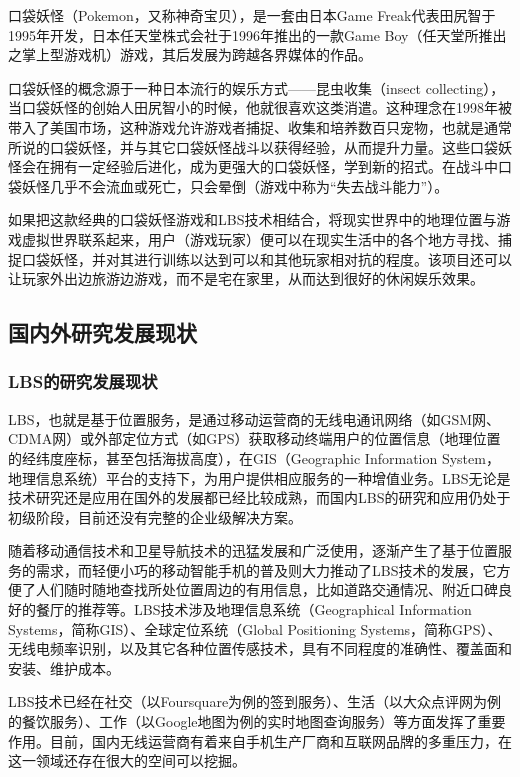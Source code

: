 \documentclass{article}
\begin{document}
\begin{CJK}{UTF8}{gbsn}
	口袋妖怪（Pokemon，又称神奇宝贝），是一套由日本Game Freak代表田尻智于1995年开发，日本任天堂株式会社于1996年推出的一款Game Boy（任天堂所推出之掌上型游戏机）游戏，其后发展为跨越各界媒体的作品。

	口袋妖怪的概念源于一种日本流行的娱乐方式——昆虫收集（insect collecting），当口袋妖怪的创始人田尻智小的时候，他就很喜欢这类消遣。这种理念在1998年被带入了美国市场，这种游戏允许游戏者捕捉、收集和培养数百只宠物，也就是通常所说的口袋妖怪，并与其它口袋妖怪战斗以获得经验，从而提升力量。这些口袋妖怪会在拥有一定经验后进化，成为更强大的口袋妖怪，学到新的招式。在战斗中口袋妖怪几乎不会流血或死亡，只会晕倒（游戏中称为“失去战斗能力”）。

	如果把这款经典的口袋妖怪游戏和LBS技术相结合，将现实世界中的地理位置与游戏虚拟世界联系起来，用户（游戏玩家）便可以在现实生活中的各个地方寻找、捕捉口袋妖怪，并对其进行训练以达到可以和其他玩家相对抗的程度。该项目还可以让玩家外出边旅游边游戏，而不是宅在家里，从而达到很好的休闲娱乐效果。

	\subsection{国内外研究发展现状}
	\subsubsection{LBS的研究发展现状}
  LBS，也就是基于位置服务，是通过移动运营商的无线电通讯网络（如GSM网、CDMA网）或外部定位方式（如GPS）获取移动终端用户的位置信息（地理位置的经纬度座标，甚至包括海拔高度），在GIS（Geographic Information System，地理信息系统）平台的支持下，为用户提供相应服务的一种增值业务。LBS无论是技术研究还是应用在国外的发展都已经比较成熟，而国内LBS的研究和应用仍处于初级阶段，目前还没有完整的企业级解决方案\cite{L06}。

   随着移动通信技术和卫星导航技术的迅猛发展和广泛使用，逐渐产生了基于位置服务的需求，而轻便小巧的移动智能手机的普及则大力推动了LBS技术的发展，它方便了人们随时随地查找所处位置周边的有用信息，比如道路交通情况、附近口碑良好的餐厅的推荐等。LBS技术涉及地理信息系统（Geographical Information Systems，简称GIS）、全球定位系统（Global Positioning Systems，简称GPS）、无线电频率识别，以及其它各种位置传感技术，具有不同程度的准确性、覆盖面和安装、维护成本\cite{L02}。

	LBS技术已经在社交（以Foursquare为例的签到服务）、生活（以大众点评网为例的餐饮服务）、工作（以Google地图为例的实时地图查询服务）等方面发挥了重要作用。目前，国内无线运营商有着来自手机生产厂商和互联网品牌的多重压力，在这一领域还存在很大的空间可以挖掘。


\end{CJK}
\end{document}
